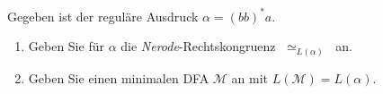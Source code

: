 
\begin{exercise}
Gegeben ist der regul\"are Ausdruck $\alpha = (bb)^*a$.
  \begin{enumerate}
    \item Geben Sie f\"ur $\alpha$ die {\it{Nerode}}-Rechtskongruenz $\;\simeq_{L(\alpha)}\;$ an.
    \item Geben Sie einen minimalen DFA ${\mathcal M}$ an mit $L({\mathcal M})= L(\alpha)$.
  \end{enumerate} 
\end{exercise}

